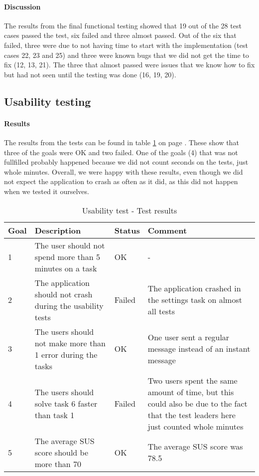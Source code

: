 \paragraph{Discussion}\hfill
\newline
The results from the final functional testing showed that 19 out of the 28 test cases passed the test,  six failed and three almost passed. Out of the six that failed, three were due to not having time to start with the implementation (test cases 22, 23 and 25) and three were known bugs that we did not get the time to fix (12, 13, 21). The three that almost passed were issues that we know how to fix but had not seen until the testing was done (16, 19, 20).


\subsection{Usability testing}
\paragraph{Results}\hfill
\newline
The results from the tests can be found in table \ref{tab:usabilitytestresults} on page \pageref{tab:usabilitytestresults}. These show that three of the goals were OK and two failed. One of the goals (4) that was not fullfilled probably happened because we did not count seconds on the tests, just whole minutes. Overall, we were happy with these results, even though we did not expect the application to crash as often as it did, as this did not happen when we tested it ourselves.

\begin{table}[h!]
\begin{center}
\begin{tabular}{l|p{6cm}|l|p{6cm}}	\hline
\textbf{Goal}&\textbf{Description}&\textbf{Status}&\textbf{Comment}\\ \hline \hline
1&The user should not spend more than 5 minutes on a task&OK&-\\ \hline
2&The application should not crash during the usability tests&Failed&The application crashed in the settings task on almost all tests\\ \hline
3&The users should not make more than 1 error during the tasks&OK&One user sent a regular message instead of an instant message\\ \hline
4&The users should solve task 6 faster than task 1&Failed&Two users spent the same amount of time, but this could also be due to the fact that the test leaders here just counted whole minutes\\ \hline
5&The average SUS score should be more than 70&OK&The average SUS score was 78.5\\ \hline 
\end{tabular}
\end{center}
\caption{Usability test - Test results} \label{tab:usabilitytestresults}
\end{table}

